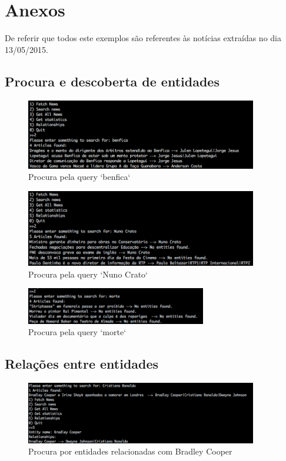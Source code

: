 \section{Anexos}
De referir que todos este exemplos são referentes às notícias extraídas no dia 13/05/2015.
\subsection{Procura e descoberta de entidades}
\begin{figure}[htbp]
  \centering
    \includegraphics[width=0.9\textwidth]{images/search3.png}
	\caption{Procura pela query `benfica`}
\end{figure}

\begin{figure}[htbp]
  \centering
    \includegraphics[width=0.9\textwidth]{images/search4.png}
	\caption{Procura pela query `Nuno Crato`}
\end{figure}

\begin{figure}[htbp]
  \centering
    \includegraphics[width=0.7\textwidth]{images/search77.png}
	\caption{Procura pela query `morte`}
\end{figure}

\newpage
\subsection{Relações entre entidades}
\begin{figure}[htbp]
  \centering
    \includegraphics[width=0.9\textwidth]{images/search5.png}
	\caption{Procura por entidades relacionadas com Bradley Cooper}
\end{figure}

